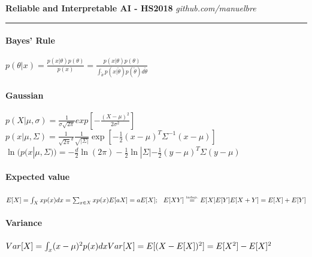 \documentclass[11pt]{extarticle}
\newcommand\tab[1][0.25cm]{\hspace*{#1}}
\begin{document}
	\begin{multicols*}{3}
    
    \begin{flushleft}
    \textbf{Reliable and Interpretable AI - HS2018}
    \hfill \textit{github.com/manuelbre}
    \end{flushleft}
    \vspace{2pt}
    \hrule
    \vspace{2pt}
		

			\paragraph{Bayes' Rule}\tab
			$p(\theta | x) = \frac{p(x | \theta) p(\theta)}{p(x)} 
			=  \frac{p(x | \theta) p(\theta)}{\int_{\tilde \theta} p(x | \tilde \theta) 
			p(\tilde \theta) d\tilde \theta} $
					
			\paragraph{Gaussian}\mbox{} $p(X|\mu,\sigma) = \frac{1}{\sigma \sqrt{2 \pi}} exp[-\frac{(X-\mu)^2}{2\sigma^2}]$\\
			$p(x|\mu, \Sigma) = \frac{1}{\sqrt{2\pi}^d}\frac{1}{\sqrt{|\Sigma|}} \exp [ -\tfrac{1}{2}(x-\mu)^T\Sigma^{-1}(x-\mu) ]$\\
            $\ln(p(x|\mu, \Sigma)) = -\tfrac{d}{2}\ln(2\pi) - \tfrac{1}{2}\ln|\Sigma| - \tfrac{1}{2}(y-\mu)^T\Sigma(y-\mu)$
          
       \paragraph{Expected value}\tab
       $
       E[X] = \int_{X} x p(x) dx = \sum_{x \in X} x p(x)  \\
       E[aX]=aE[X] ; \tab E[XY] \stackrel{\text{\tiny indep.}}{=} E[X]E[Y] \\
       E[X+Y] = E[X]+E[Y]
       $
       \paragraph{Variance}\tab
       $
       Var[X]=\int_x(x-\mu)^2p(x) dx \\
       Var[X]=E[(X-E[X])^2]=E[X^2]-E[X]^2
       $

\end{multicols*}
\end{document}
